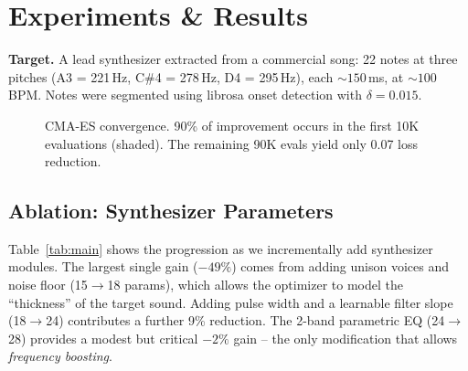 \documentclass[10pt,twocolumn]{article}
\begin{document}
\section{Experiments \& Results}

\textbf{Target.} A lead synthesizer extracted from a commercial song: 22 notes at three pitches (A3 = 221\,Hz, C\#4 = 278\,Hz, D4 = 295\,Hz), each ${\sim}150$\,ms, at ${\sim}100$\,BPM. Notes were segmented using librosa onset detection with $\delta{=}0.015$.

\begin{figure}[t]
\centering
{}
\caption{CMA-ES convergence. 90\% of improvement occurs in the first 10K evaluations (shaded). The remaining 90K evals yield only 0.07 loss reduction.}
\label{fig:convergence}
\end{figure}

\subsection{Ablation: Synthesizer Parameters}

Table~\ref{tab:main} shows the progression as we incrementally add synthesizer modules. The largest single gain ($-49\%$) comes from adding unison voices and noise floor (15$\to$18 params), which allows the optimizer to model the ``thickness'' of the target sound. Adding pulse width and a learnable filter slope (18$\to$24) contributes a further 9\% reduction. The 2-band parametric EQ (24$\to$28) provides a modest but critical $-2\%$ gain -- the only modification that allows \emph{frequency boosting}.
\end{document}
